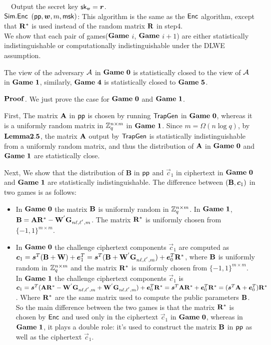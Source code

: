 ~~Output the secret key $\mathsf{sk}_{\boldsymbol{v}}=\boldsymbol{r}$.\\[0.4cm]
$\mathsf{Sim}.\mathsf{Enc}$ $(\mathsf{pp},\boldsymbol{w},m,\mathsf{msk})$: This algorithm is the same as the $\mathsf{Enc}$ algorithm, except that $\mathbf{R}^{*}$ is used instead of the random matrix $\mathbf{R}$ in step4.\\[0.6cm]
We show that each pair of games($\mathbf{Game}$ $i$, $\mathbf{Game}$ $i+1$) are either statistically indistinguishable or computationally indistinguishable under the DLWE assumption.
\begin{lemma}
The view of the adversary $\mathcal{A}$ in $\mathbf{Game\ 0}$ is statistically closed to the view of $\mathcal{A}$ in $\mathbf{Game\ 1}$, similarly, $\mathbf{Game\ 4}$ is statistically closed to $\mathbf{Game\ 5}$.
\end{lemma}
\noindent $\mathbf{Proof}$. We just prove the case for $\mathbf{Game\ 0}$ and $\mathbf{Game\ 1}$.\

First, The matrix $\mathbf{A}$ in $\mathsf{pp}$ is chosen by running $\mathsf{TrapGen}$ in $\mathbf{Game\ 0}$, whereas it is a uniformly random matrix in $\mathbb{Z}^{n \times m}_{q}$ in $\mathbf{Game\ 1}$. Since $m=\Omega(n \log q)$, by $\mathbf{Lemma2.5}$, the matrix $\mathbf{A}$ output by $\mathsf{TrapGen}$  is statistically indistinguishable from a uniformly random matrix, and thus the distribution of $\mathbf{A}$ in $\mathbf{Game\ 0}$ and $\mathbf{Game\ 1}$ are statistically close.\

Next, We show that the distribution of \textbf{B} in $\mathsf{pp}$ and $\vec{c}_{1}$ in ciphertext in $\mathbf{Game\ 0}$ and $\mathbf{Game\ 1}$ are statistically indistinguishable. The difference between $(\mathbf{B},\boldsymbol{c}_{1})$ in two games is as follows:
\begin{itemize}
\item In $\mathbf{Game\ 0}$ the matrix $\mathbf{B}$ is uniformly random in $\mathbb{Z}^{n \times m}_{q}$. In $\mathbf{Game\ 1}$, $\mathbf{B}=\mathbf{A}\mathbf{R}^{*}-\mathbf{W}^{'}\mathbf{G}_{n\ell,\ell^{'},m}$. The matrix $\mathbf{R}^{*}$ is uniformly chosen from $\{-1,1\}^{m \times m}$.
\item In $\mathbf{Game\ 0}$ the challenge ciphertext components $\vec{c}_{1}$ are computed as $\boldsymbol{c}_{1}=\boldsymbol{s}^{T}(\mathbf{B}+\mathbf{W})+\boldsymbol{e}^{T}_{1}=\boldsymbol{s}^{T}(\mathbf{B}+\mathbf{W}^{'}\mathbf{G}_{n\ell,\ell^{'},m})+\boldsymbol{e}^{T}_{0}\mathbf{R}^{*}$, where $\mathbf{B}$ is uniformly random in $\mathbb{Z}^{n \times m}_{q}$ and the matrix $\mathbf{R}^{*}$ is uniformly chosen from $\{-1,1\}^{m \times m}$.\\
    In $\mathbf{Game\ 1}$ the challenge ciphertext components $\vec{c}_{1}$ is $\boldsymbol{c}_{1}=\boldsymbol{s}^{T}(\mathbf{A}\mathbf{R}^{*}-\mathbf{W}^{'}\mathbf{G}_{n\ell,\ell^{'},m}+\mathbf{W}^{'}\mathbf{G}_{n\ell,\ell^{'},m})+\boldsymbol{e}^{T}_{0}\mathbf{R}^{*}=\boldsymbol{s}^{T}\mathbf{A}\mathbf{R}^{*}+\boldsymbol{e}^{T}_{0}\mathbf{R}^{*}
    =(\boldsymbol{s}^{T}\mathbf{A}+\boldsymbol{e}^{T}_{0})\mathbf{R}^{*}$. Where $\mathbf{R}^{*}$ are the same matrix used to compute the public parameters $\mathbf{B}$. So the main difference between the two games is that the matrix $\mathbf{R}^{*}$ is chosen by $\mathsf{Enc}$ and used only in the ciphertext $\vec{c}_{1}$ in $\mathbf{Game\ 0}$, whereas in $\mathbf{Game\ 1}$, it plays a double role: it's used to construct the matrix $\mathbf{B}$ in $\mathsf{pp}$ as well as the ciphertext $\vec{c}_{1}$.
\end{itemize}

